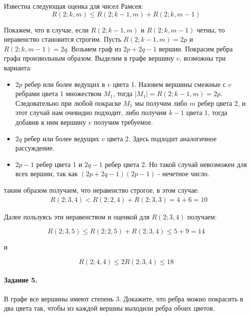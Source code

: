 \documentclass[a4paper,12pt]{article}
\begin{document}
\begin{Solution}
Известна следующая оценка для чисел Рамсея:
\[
	R\left(2; k, m\right) \le R\left(2; k-1, m\right) + R\left(2; k, m-1\right)
\]

Покажем, что в случае, если $R\left(2; k-1, m\right)$ и $R\left(2; k, m-1\right)$ четны, то неравенство становится строгим. Пусть $R\left(2; k-1, m\right) = 2p$ и $R\left(2; k, m-1\right) = 2q$. Возьмем граф из $2p+2q-1$ вершин. Покрасим ребра графа произвольным образом. Выделим в графе вершину $v$, возможны три варианта:
\begin{itemize}
\item $2p$ ребер или более ведущих в $v$ цвета 1. Назовем вершины смежные с $v$ ребрами цвета 1 множеством $M_1$, тогда $\left|M_1\right| = R\left(2; k-1, m\right) = 2p$. Следовательно при любой покраске $M_1$ мы получим либо $m$ ребер цвета 2, и этот случай нам очевидно подходит, либо получим $k-1$ цвета $1$, тогда добавив к ним вершину $v$ получим требуемое.

\item $2q$ ребер или более ведущих $v$ цвета 2. Здесь подходит аналогичное рассуждение.

\item $2p-1$ ребер цвета 1 и $2q-1$ ребер цвета 2. Но такой случай невозможен для всех вершин, так как $\left(2p+2q-1\right)\left(2p-1\right)$ - нечетное число.
\end{itemize}

таким образом получаем, что неравенство строгое, в этом случае:
\[
	\begin{split}
		&R\left(2;3,4\right) < R\left(2;2,4\right) + R\left(2;3,3\right) = 4 + 6 = 10
	\end{split}
\]

Далее пользуясь эти неравенством и оценкой для $R\left(2;3,4\right)$ получаем:

\[
	R\left(2; 3, 5\right) \le R\left(2; 2, 5\right) + R\left(2; 3, 4\right) \le 5 + 9 = 14
\]

и

\[
	R\left(2; 4, 4\right) \le 2 R\left(2; 3, 4\right) \le 18
\]
\end{Solution}

\paragraph{Задание 5.} В графе все вершины имеют степень 3. Докажите, что ребра можно покрасить в два цвета так, чтобы из каждой вершиы выходили ребра обоих цветов.
\end{document}
